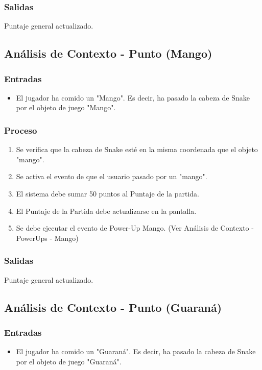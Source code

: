 \documentclass[letterpaper]{scrreprt}
\begin{document}
\subsubsection{Salidas}
Puntaje general actualizado.

\subsection{Análisis de Contexto - Punto (Mango)}
\subsubsection{Entradas}
\begin{itemize}
	\item El jugador ha comido un "Mango". Es decir, ha pasado la cabeza de Snake por el objeto de juego "Mango".
\end{itemize}
\subsubsection{Proceso}
\begin{enumerate}
	\item Se verifica que la cabeza de Snake esté en la misma coordenada que el objeto "mango".
	\item Se activa el evento de que el usuario pasado por un "mango".
	\item El sistema debe sumar 50 puntos al Puntaje de la partida.
	\item El Puntaje de la Partida debe actualizarse en la pantalla.
	\item Se debe ejecutar el evento de Power-Up Mango. (Ver Análisis de Contexto - PowerUps - Mango)
\end{enumerate}
\subsubsection{Salidas}
Puntaje general actualizado.

\subsection{Análisis de Contexto - Punto (Guaraná)}
\subsubsection{Entradas}
\begin{itemize}
	\item El jugador ha comido un "Guaraná". Es decir, ha pasado la cabeza de Snake por el objeto de juego "Guaraná".
\end{itemize}
\end{document}
